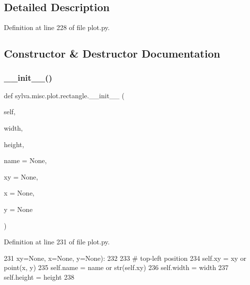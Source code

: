 \subsection{Detailed Description}


Definition at line 228 of file plot.\+py.



\subsection{Constructor \& Destructor Documentation}
\mbox{\label{classsylva_1_1misc_1_1plot_1_1rectangle_aa01b01f82b1ab5f4e7fb2bba478a13e6}} 
\subsubsection{\texorpdfstring{\+\_\+\+\_\+init\+\_\+\+\_\+()}{\_\_init\_\_()}}
{\footnotesize\ttfamily def sylva.\+misc.\+plot.\+rectangle.\+\_\+\+\_\+init\+\_\+\+\_\+ (\begin{DoxyParamCaption}\item[{}]{self,  }\item[{}]{width,  }\item[{}]{height,  }\item[{}]{name = {\ttfamily None},  }\item[{}]{xy = {\ttfamily None},  }\item[{}]{x = {\ttfamily None},  }\item[{}]{y = {\ttfamily None} }\end{DoxyParamCaption})}



Definition at line 231 of file plot.\+py.


\begin{DoxyCode}
231                      xy=\textcolor{keywordtype}{None}, x=\textcolor{keywordtype}{None}, y=\textcolor{keywordtype}{None}):
232 
233             \textcolor{comment}{# top-left position}
234             self.xy = xy \textcolor{keywordflow}{or} point(x, y)
235             self.name = name \textcolor{keywordflow}{or} str(self.xy)
236             self.width = width
237             self.height = height
238 
\end{DoxyCode}


